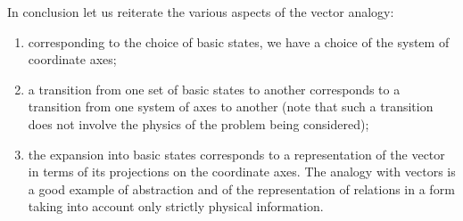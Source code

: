 \documentclass[a4paper,sfsidenotes,colorlinks=true]{tufte-book}
\numberwithin{equation}{section}
\numberwithin{figure}{section}
\begin{document}
In conclusion let us reiterate the various aspects of the vector
analogy: 
\begin{enumerate}[label=(\alph*), leftmargin=1cm]
\item corresponding to the choice of basic states, we have a choice of
  the system of coordinate axes;
\item a transition from one set of basic states to another corresponds
  to a transition from one system of axes to another (note that such a
  transition does not involve the physics of the problem being
  considered);
\item the expansion into basic states corresponds to a representation
  of the vector in terms of its projections on the coordinate
  axes. The analogy with vectors is a good example of abstraction and
  of the representation of relations in a form taking into account
  only strictly physical information.
\end{enumerate}
\end{document}
